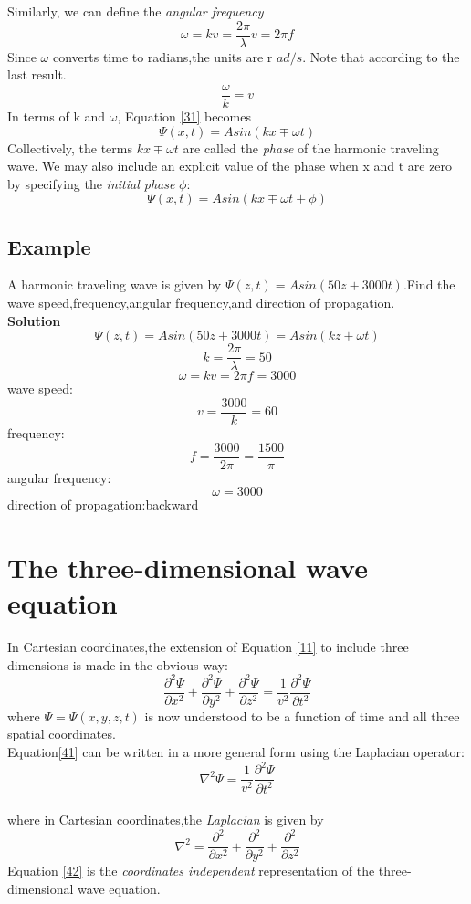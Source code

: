 \documentclass[12pt]{article}
\numberwithin{equation}{section}
\begin{document}
    Similarly, we can define the \emph{angular frequency} 
    \begin{equation}
        \omega=kv=\frac{2\pi}{\lambda}v=2\pi f\label{37}
    \end{equation}
    Since $\omega$ converts time to radians,the units are r $ad/s$. Note that according to the last result.
    \begin{equation}
        \frac{\omega}{k}=v\label{38}
    \end{equation}
    \indent In terms of k and $\omega$, Equation \eqref{31} becomes
    \[
        \Psi(x,t)=Asin(kx\mp \omega t)
    \]
    Collectively, the terms $kx \mp\omega t$ are called the \emph{phase} of the harmonic traveling wave. We may also include an explicit value of the phase when x and t are zero by specifying the \emph{initial phase} $\phi$:
    \begin{equation}
        \Psi(x,t)=Asin(kx\mp \omega t+\phi)\label{39}
    \end{equation}
\subsection{Example}
A harmonic traveling wave is given by $\Psi(z,t)=Asin(50z+3000t)$.Find the wave speed,frequency,angular frequency,and direction of propagation.
\\
\indent \textbf{Solution}
\[
    \Psi(z,t)=Asin(50z+3000t)=Asin(kz+\omega t)
\]
\[
    k=\frac{2\pi}{\lambda}=50
\]
\[
    \omega=kv=2\pi f=3000
\]
wave speed:
\[
    v=\frac{3000}{k}=60
\]
frequency:
\[
    f=\frac{3000}{2\pi}=\frac{1500}{\pi}
\]
angular frequency:
\[
    \omega=3000
\]
direction of propagation:backward 
\section{The three-dimensional wave equation}
In Cartesian coordinates,the extension of Equation \eqref{11} to include three dimensions is made in the obvious way:
\begin{equation}
    \frac{\partial^2 {\Psi}}{\partial{x^2}}+\frac{\partial^2 {\Psi}}{\partial{y^2}}+\frac{\partial^2 {\Psi}}{\partial{z^2}}=\frac{1}{v^2}\frac{\partial^2 {\Psi}}{\partial{t^2}}\label{41}
\end{equation}
where $\Psi=\Psi(x,y,z,t)$ is now understood to be a function of time and all three spatial coordinates.\\
\indent Equation\eqref{41} can be written in a more general form using the Laplacian operator:
\begin{equation}
    \nabla^2{\Psi}=\frac{1}{v^2}\frac{\partial^2{\Psi}}{\partial{t^2}}\label{42}
\end{equation}
\\
where in Cartesian coordinates,the \emph{Laplacian} is given by
\begin{equation}
    \nabla^2=\frac{\partial^2 }{\partial{x^2}}+\frac{\partial^2 }{\partial{y^2}}+\frac{\partial^2 }{\partial{z^2}}\label{43}
\end{equation}
Equation \eqref{42} is the \emph{coordinates independent} representation of the three-dimensional wave equation.
\end{document}
